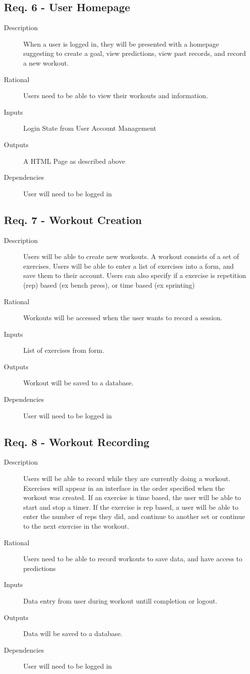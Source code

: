 \documentclass[12pt]{article}
\begin{document}
\subsection{Req. 6 - User Homepage}
\begin{description}
	\item[Description] When a user is logged in, they will be presented with a homepage suggesting to create a goal, view predictions, view past records, and record a new workout.
	\item[Rational] Users need to be able to view their workouts and information.
	\item[Inputs] Login State from User Account Management
	\item[Outputs] A HTML Page as described above
	\item[Dependencies] User will need to be logged in
\end{description}

\subsection{Req. 7 - Workout Creation}
\begin{description}
    \item[Description] Users will be able to create new workouts. A workout consists of a set of exercises. Users will be able to enter a list of exercises into a form, and save them to their account. Users can also specify if a exercise is repetition (rep) based (ex bench press), or time based (ex sprinting)
	\item[Rational] Workouts will be accessed when the user wants to record a session.
	\item[Inputs] List of exercises from form.
	\item[Outputs] Workout will be saved to a database.
	\item[Dependencies] User will need to be logged in
\end{description}

\subsection{Req. 8 - Workout Recording}
\begin{description}
	\item[Description] Users will be able to record while they are currently doing a workout. Exercises will appear in an interface in the order specified when the workout was created. If an exercise is time based, the user will be able to start and stop a timer. If the exercise is rep based, a user will be able to enter the number of reps they did, and continue to another set or continue to the next exercise in the workout.
	\item[Rational] Users need to be able to record workouts to save data, and have access to predictions
	\item[Inputs] Data entry from user during workout untill completion or logout.
	\item[Outputs] Data will be saved to a database.
	\item[Dependencies] User will need to be logged in
\end{description}
\end{document}
